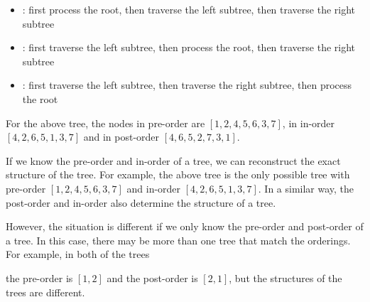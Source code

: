 \begin{itemize}
\item {}: first process the root,
then traverse the left subtree, then traverse the right subtree
\item {}: first traverse the left subtree,
then process the root, then traverse the right subtree
\item {}: first traverse the left subtree,
then traverse the right subtree, then process the root
\end{itemize}

For the above tree, the nodes in
pre-order are
$[1,2,4,5,6,3,7]$,
in in-order $[4,2,6,5,1,3,7]$
and in post-order $[4,6,5,2,7,3,1]$.

If we know the pre-order and in-order
of a tree, we can reconstruct the exact structure of the tree.
For example, the above tree is the only possible tree
with pre-order $[1,2,4,5,6,3,7]$ and
in-order $[4,2,6,5,1,3,7]$.
In a similar way, the post-order and in-order
also determine the structure of a tree.

However, the situation is different if we only know
the pre-order and post-order of a tree.
In this case, there may be more than one tree
that match the orderings.
For example, in both of the trees
\begin{center}
\end{center}
the pre-order is $[1,2]$ and the post-order is $[2,1]$,
but the structures of the trees are different.

